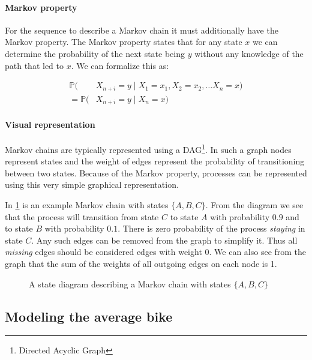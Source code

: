 \paragraph{Markov property}\label{markov:property}
For the sequence to describe a Markov chain it must additionally have the Markov property.
The Markov property states that for any state $x$ we can determine the probability of the next state being $y$ without any knowledge of the path that led to $x$.
We can formalize this as:

\begin{align*}\label{markov:eq:markov_prob}
\mathbb{P}(&X_{n+i} = y \mid X_1 = x_1, X_2 = x_2, \dots X_n = x)\\
= \mathbb{P}(&X_{n+i} = y \mid X_n = x)
\end{align*}


\paragraph{Visual representation}
Markov chains are typically represented using a DAG\footnote{Directed Acyclic Graph}.
In such a graph nodes represent states and the weight of edges represent the probability of transitioning between two states.
Because of the Markov property, processes can be represented using this very simple graphical representation.

In \cref{markov:model:example1} is an example Markov chain with states $\{A, B, C\}$.
From the diagram we see that the process will transition from state $C$ to state $A$ with probability $0.9$ and to state $B$ with probability $0.1$.
There is zero probability of the process \textit{staying} in state $C$.
Any such edges can be removed from the graph to simplify it.
Thus all \emph{missing} edges should be considered edges with weight 0.
We can also see from the graph that the sum of the weights of all outgoing edges on each node is 1.

\begin{figure}[H]
\centering
{}
\caption{A state diagram describing a Markov chain with states $\{A, B, C\}$}
\label{markov:model:example1}
\end{figure}

\subsection{Modeling the average bike}\label{markov:modeling}

